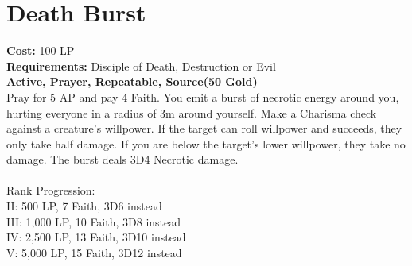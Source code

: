 \section{Death Burst}\label{prayer:deathBurst}
\textbf{Cost:} 100 LP\\
\textbf{Requirements:} Disciple of Death, Destruction or Evil \\
\textbf{Active, Prayer, Repeatable, Source(50 Gold)}\\
Pray for 5 AP and pay 4 Faith.
You emit a burst of necrotic energy around you, hurting everyone in a radius of 3m around yourself.
Make a Charisma check against a creature's willpower.
If the target can roll willpower and succeeds, they only take half damage.
If you are below the target's lower willpower, they take no damage.
The burst deals 3D4 Necrotic damage.\\
\\
Rank Progression:\\
II: 500 LP, 7 Faith, 3D6 instead\\
III: 1,000 LP, 10 Faith, 3D8 instead\\
IV: 2,500 LP, 13 Faith, 3D10 instead\\
V: 5,000 LP, 15 Faith, 3D12 instead\\